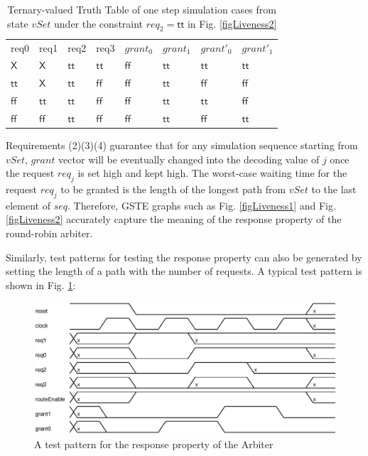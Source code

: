 \documentclass[final]{IEEEtran}
\newcommand{\mathid}[1]{\ensuremath{\mathit{#1}}}
\begin{document}
\begin{center}
\begin{table}[tbp]
\caption{Ternary-valued Truth Table of one step simulation cases
from state $vSet$ under the constraint $req_2=\mathsf{tt}$ in Fig.
\ref{figLiveness2}} \label{tab2}
\begin{center}
\begin{tabular}{llllllll}
req0 & req1 & req2 & req3 & $grant_0$ & $grant_1$ & $grant'_0$ & $grant'_1$ \\


$\mathsf{X}$ & $\mathsf{X}$ & $\mathsf{tt}$ & $\mathsf{tt}$ &
$\mathsf{ff}$ & $\mathsf{tt}$ &
 $\mathsf{tt}$ & $\mathsf{tt}$ \\

$\mathsf{tt}$ & $\mathsf{X}$ & $\mathsf{tt}$ & $\mathsf{ff}$ &
$\mathsf{ff}$ & $\mathsf{tt}$ & $\mathsf{ff}$ & $\mathsf{ff}$\\

$\mathsf{ff}$ & $\mathsf{tt}$ & $\mathsf{tt}$ & $\mathsf{ff}$ &
$\mathsf{ff}$ & $\mathsf{tt}$ & $\mathsf{tt}$ & $\mathsf{ff}$\\

$\mathsf{ff}$ & $\mathsf{ff}$ & $\mathsf{tt}$ & $\mathsf{ff}$ &
$\mathsf{ff}$ & $\mathsf{tt}$ & $\mathsf{ff}$ & $\mathsf{tt}$
\end{tabular}%
\end{center}
\end{table}
\end{center}

Requirements (2)(3)(4) guarantee that for any simulation sequence
starting from $vSet$,
 $\mathid{grant}$ vector will be eventually changed into the decoding value of $j$ once the request
$req_j$ is set high and kept high. The  worst-case waiting time for
 the request $req_j$ to be granted  is the length of the longest path from
$vSet$ to the last element of $seq$. Therefore, GSTE graphs such as
Fig. \ref{figLiveness1} and Fig. \ref{figLiveness2} accurately capture
the meaning of the response property of the round-robin arbiter.

Similarly, test patterns for testing the response property can also
be generated by setting the length of a path with the number of
requests. A typical test pattern is shown in Fig.
\ref{fig:TestPatternForResponse}:

\begin{figure}[tbph]
\begin{center}
\includegraphics[width=.5\textwidth]{patResp.eps}
\end{center}
\caption{A test pattern for the response property of the Arbiter}
\label{fig:TestPatternForResponse}
\end{figure}
\end{document}
